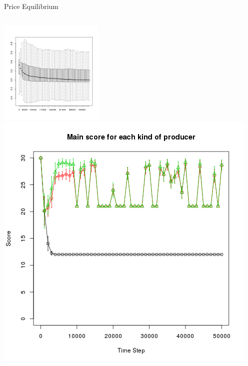 \documentclass[final]{beamer}
\begin{document}
\begin{frame}
\begin{columns}
		\begin{block}{Price Equilibrium}
			\begin{columns}
				\includegraphics[height=5cm]{./NonEquilibrium.png}
				\includegraphics[width=\textwidth]{./scoreEx1b.png}\\

\end{columns}
\end{block}
\end{columns}
\end{frame}
\end{document}
